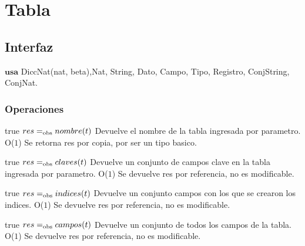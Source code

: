 



\section{Tabla}

\subsection{Interfaz}

$\textbf{usa}$  
 {DiccNat(nat, beta),}{Nat, String, Dato, Campo, Tipo, Registro, ConjString, ConjNat.}




\subsubsection*{Operaciones}



 {true}
 {$res =_{\mathrm{obs}} nombre(t)$}
 {Devuelve el nombre de la tabla ingresada por parametro.}
 {O($1$)}
 {Se retorna res por copia, por ser un tipo basico.}

 {true}
 {$res =_{\mathrm{obs}} claves(t)$}
 {Devuelve un conjunto de campos clave en la tabla ingresada por parametro.}
 {O($1$)}
 {Se devuelve res por referencia, no es modificable.}
 
 {true}
 {$res =_{\mathrm{obs}} indices(t)$}
 {Devuelve un conjunto campos con los que se crearon los indices.}
 {O($1$)}
 {Se devuelve res por referencia, no es modificable.}
 
 {true}
 {$res =_{\mathrm{obs}} campos(t)$}
 {Devuelve un conjunto de todos los campos de la tabla.}
 {O($1$)}
 {Se devuelve res por referencia, no es modificable.}

